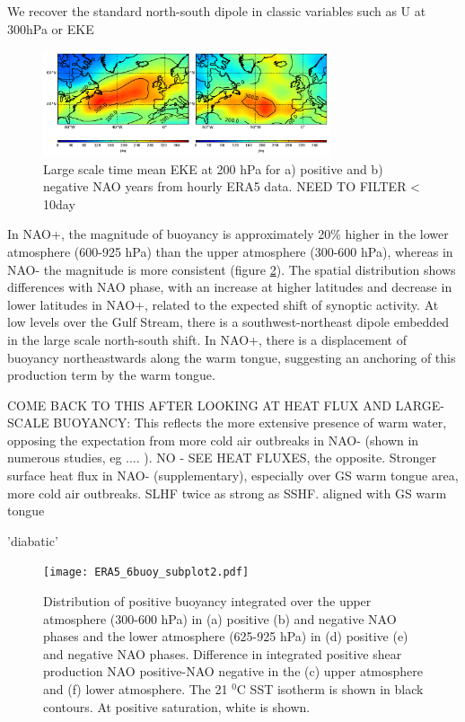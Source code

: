 We recover the standard north-south dipole in classic variables such as U at 300hPa or EKE 

\begin{figure}[h]
	\centering
	\includegraphics[width=20pc]{ERA5_EKE200_subplot.pdf}
	\caption{Large scale time mean EKE at 200 hPa for a) positive and b) negative NAO years from hourly ERA5 data. NEED TO FILTER < 10day}
	\label{fig:ERA5_EKE200_NAO}
\end{figure}


In NAO+, the magnitude of buoyancy is approximately 20\% higher in the lower atmosphere (600-925 hPa) than the upper atmosphere (300-600 hPa), whereas in NAO- the magnitude is more consistent (figure \ref{fig:ERA5_buoy}). The spatial distribution shows differences with NAO phase, with an increase at higher latitudes and decrease in lower latitudes in NAO+, related to the expected shift of synoptic activity. At low levels over the Gulf Stream, there is a southwest-northeast dipole embedded in the large scale north-south shift. In NAO+, there is a displacement of buoyancy northeastwards along the warm tongue, suggesting an anchoring of this production term by the warm tongue. 

COME BACK TO THIS AFTER LOOKING AT HEAT FLUX AND LARGE-SCALE BUOYANCY:
This reflects the more extensive presence of warm water, opposing the expectation from more cold air outbreaks in NAO- (shown in numerous studies, eg .... \citep{fletcher2016climatology}). NO - SEE HEAT FLUXES, the opposite.
Stronger surface heat flux in NAO- (supplementary), especially over GS warm tongue area, more cold air outbreaks. SLHF twice as strong as SSHF. aligned with GS warm tongue

'diabatic'

\begin{figure}[h]
	\centering
	\texttt{[image: ERA5\_6buoy\_subplot2.pdf]}
	\caption{Distribution of positive buoyancy integrated over the upper atmosphere (300-600 hPa) in (a) positive (b) and negative NAO phases and the lower atmosphere (625-925 hPa) in (d) positive (e) and negative NAO phases. Difference in integrated positive shear production NAO positive-NAO negative in the (c) upper atmosphere and (f) lower atmosphere. The 21 $^{0}$C SST isotherm is shown in black contours. At positive saturation, white is shown.}
	\label{fig:ERA5_buoy}
\end{figure}


